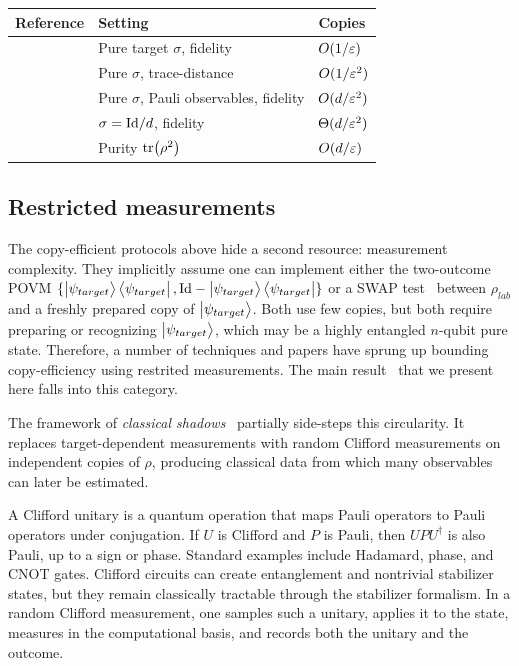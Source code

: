 \begin{table}[H]
\centering
\small
\begin{tabular}{lll}
\toprule
Reference & Setting & Copies \\
\midrule
\cite{montanaro2013survey} & Pure target $\sigma$, fidelity & $O(1/\varepsilon)$ \\
\cite{montanaro2013survey} & Pure $\sigma$, trace-distance & $O(1/\varepsilon^2)$ \\
\cite{flammia2011direct,da2011practical,aolita2015reliable} & Pure $\sigma$, Pauli observables, fidelity & $O(d/\varepsilon^2)$ \\
\cite{odonnell2015quantum} & $\sigma = \mathrm{Id}/d$, fidelity & $\Theta(d/\varepsilon^2)$ \\
  \cite{odonnell2015quantum} & Purity $\tr(\rho^2)$ & $O(d/\varepsilon)$ \\
\bottomrule
\end{tabular}
\end{table}

\subsection{Restricted measurements} \label{sec:restricted-measurement}

The copy-efficient protocols above hide a second resource: measurement complexity. They implicitly assume one can implement either the two-outcome POVM $\{\ket{\psi_{target}}\bra{\psi_{target}}, \mathrm{Id} - \ket{\psi_{target}}\bra{\psi_{target}}\}$ or a SWAP test~\cite{buhrman2001quantum} between $\rho_{lab}$ and a freshly prepared copy of $\ket{\psi_{target}}$. Both use few copies, but both require preparing or recognizing $\ket{\psi_{target}}$, which may be a highly entangled $n$-qubit pure state. Therefore, a number of techniques and papers have sprung up bounding copy-efficiency using restrited measurements.  The main result~\cite{gupta2025singlequbitmeasurementssufficecertify} that we present here falls into this category.

The framework of \emph{classical shadows}~\cite{huang2020predicting} partially side-steps this circularity. It replaces target-dependent measurements with random Clifford measurements on independent copies of $\rho$, producing classical data from which many observables can later be estimated.

A Clifford unitary is a quantum operation that maps Pauli operators to Pauli operators under conjugation. If $U$ is Clifford and $P$ is Pauli, then $UPU^\dagger$ is also Pauli, up to a sign or phase. Standard examples include Hadamard, phase, and CNOT gates. Clifford circuits can create entanglement and nontrivial stabilizer states, but they remain classically tractable through the stabilizer formalism. In a random Clifford measurement, one samples such a unitary, applies it to the state, measures in the computational basis, and records both the unitary and the outcome.

